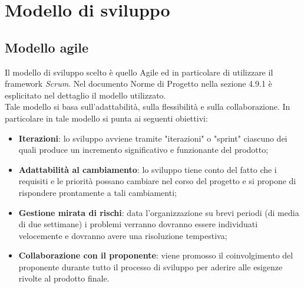 \section{Modello di sviluppo}
\subsection{Modello agile}
Il modello di sviluppo scelto è quello Agile ed in particolare di utilizzare il framework \emph{Scrum}. Nel documento Norme di Progetto nella sezione 4.9.1 è esplicitato nel dettaglio il modello utilizzato.\\ 
Tale modello si basa sull'adattabilità, sulla flessibilità e sulla collaborazione.
In particolare in tale modello si punta ai seguenti obiettivi:
\begin{itemize}
    \item \textbf{Iterazioni}: lo sviluppo avviene tramite "iterazioni" o "sprint" ciascuno dei quali produce un incremento significativo e funzionante del prodotto;
    \item \textbf{Adattabilità al cambiamento}: lo sviluppo tiene conto del fatto che i requisiti e le priorità possano cambiare nel corso del progetto e si propone di rispondere prontamente a tali cambiamenti;
    \item \textbf{Gestione mirata di rischi}: data l'organizzazione su brevi periodi (di media di due settimane) i problemi verranno dovranno essere individuati velocemente e dovranno avere una risoluzione tempestiva;
    \item \textbf{Collaborazione con il proponente}: viene promosso il coinvolgimento del proponente durante tutto il processo di sviluppo per aderire alle esigenze rivolte al prodotto finale.
\end{itemize}

